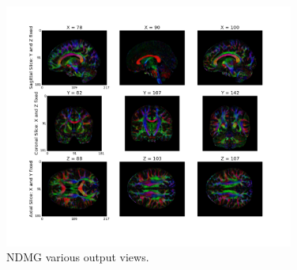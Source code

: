 \documentclass[simplex.tex]{subfiles}
\begin{document}
\begin{figure}[h!]
\begin{cframed}
\centering
\includegraphics[width=0.85\textwidth]{./figs/ndmg.png}
\caption{
NDMG various output views.  
}
\label{fig:ndmg}
\end{cframed}
\end{figure}
\end{document}
